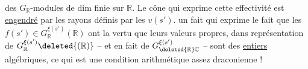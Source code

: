 des $G_{\mathbb{R}}$-modules de dim finie sur $\mathbb{R}$. Le cône qui exprime cette effectivité est \uline{engendré} par les  rayons définis par les $v(s')$.  un fait qui exprime  le fait que les  $f(s')\in G_{\mathbb{R}}^{\xi(s')}(\mathbb{R})$ ont la vertu que leurs valeurs propres, dans  représentation de $G_{\mathbb{R}}^{\xi(s')}\deleted{(\mathbb{R})}$ -- et en fait  de $G_{\deleted{\mathbb{R}}\mathbb{C}}^{\xi(s')}$ -- sont des \uline{entiers} algébriques, ce qui est une condition arithmétique assez draconienne !
